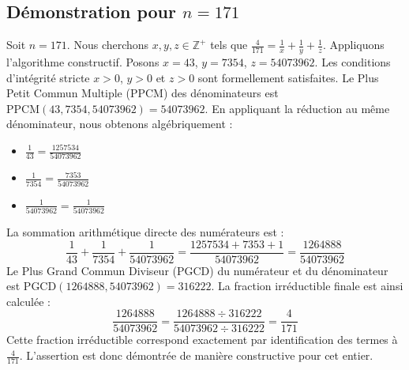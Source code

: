 \documentclass[11pt,a4paper]{article}
\begin{document}
\subsection{Démonstration pour $n = 171$}
Soit $n = 171$. Nous cherchons $x, y, z \in \mathbb{Z}^{+}$ tels que $\frac{4}{171} = \frac{1}{x} + \frac{1}{y} + \frac{1}{z}$.
Appliquons l'algorithme constructif. Posons $x = 43$, $y = 7354$, $z = 54073962$.
Les conditions d'intégrité stricte $x > 0$, $y > 0$ et $z > 0$ sont formellement satisfaites.
Le Plus Petit Commun Multiple (PPCM) des dénominateurs est $\text{PPCM}(43, 7354, 54073962) = 54073962$.
En appliquant la réduction au même dénominateur, nous obtenons algébriquement :
\begin{itemize}
    \item $\frac{1}{43} = \frac{1257534}{54073962}$
    \item $\frac{1}{7354} = \frac{7353}{54073962}$
    \item $\frac{1}{54073962} = \frac{1}{54073962}$
\end{itemize}
La sommation arithmétique directe des numérateurs est :
$$ \frac{1}{43} + \frac{1}{7354} + \frac{1}{54073962} = \frac{1257534 + 7353 + 1}{54073962} = \frac{1264888}{54073962} $$
Le Plus Grand Commun Diviseur (PGCD) du numérateur et du dénominateur est $\text{PGCD}(1264888, 54073962) = 316222$.
La fraction irréductible finale est ainsi calculée :
$$ \frac{1264888}{54073962} = \frac{1264888 \div 316222}{54073962 \div 316222} = \frac{4}{171} $$
Cette fraction irréductible correspond exactement par identification des termes à $\frac{4}{171}$. L'assertion est donc démontrée de manière constructive pour cet entier.
\end{document}
